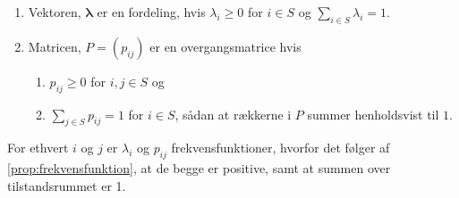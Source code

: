 \begin{minipage}\textwidth
\begin{kor} \textbf{} %
\newline
\begin{enumerate}[label=(\alph*)]
    \item Vektoren, $\bm{\lambda}$ er en fordeling, hvis $\lambda_i\geq 0$ for $i\in S$ og $\sum_{i\in S}\lambda_i=1$.
    \item Matricen, $P=(p_{ij})$ er en overgangsmatrice hvis 
    \begin{enumerate}[label=(\roman*)]
    \item $p_{ij}\geq0$ for $i,j\in S$ og
    \item $\sum_{j\in S}p_{ij}=1$ for $i\in S$, sådan at rækkerne i $P$ summer henholdsvist til $1$. 
    \end{enumerate}
\end{enumerate}
\end{kor}
\end{minipage}
\begin{bev} \textbf{} %
\newline
For ethvert $i$ og $j$ er $\lambda_i$ og $p_{ij}$ frekvensfunktioner, hvorfor det følger af \autoref{prop:frekvensfunktion}, at 
de begge er positive, samt at summen over tilstandsrummet er 1.
\end{bev}

